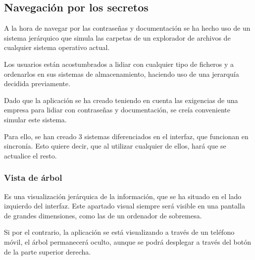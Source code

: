 \documentclass{\ClassPath/viu-tfm-template}
\begin{document}
\subsection{Navegación por los secretos}

A la hora de navegar por las contraseñas y documentación se ha hecho uso de un sistema jerárquico que simula las carpetas de un explorador de archivos de cualquier sistema operativo actual.

Los usuarios están acostumbrados a lidiar con cualquier tipo de ficheros y a ordenarlos en sus sistemas de almacenamiento, haciendo uso de una jerarquía decidida previamente.

Dado que la aplicación se ha creado teniendo en cuenta las exigencias de una empresa para lidiar con contraseñas y documentación, se creía conveniente simular este sistema.

Para ello, se han creado 3 sistemas diferenciados en el interfaz, que funcionan en sincronía. Esto quiere decir, que al utilizar cualquier de ellos, hará que se actualice el resto.

\subsubsection*{Vista de árbol}
Es una visualización jerárquica de la información, que se ha situado en el lado izquierdo del interfaz. Este apartado visual siempre será visible en una pantalla de grandes dimensiones, como las de un ordenador de sobremesa.

Si por el contrario, la aplicación se está visualizando a través de un teléfono móvil, el árbol permanecerá oculto, aunque se podrá desplegar a través del botón de la parte superior derecha.
\end{document}
